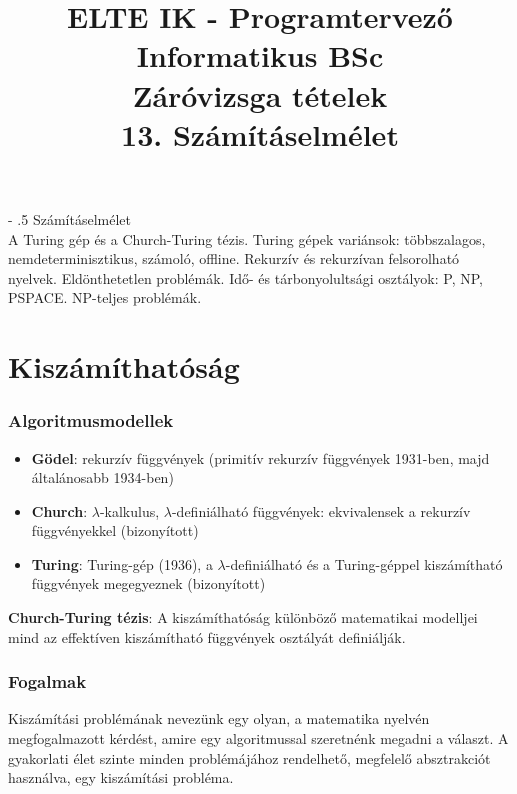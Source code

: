 \documentclass[margin=0px]{article}
\title{\textbf{{\Large ELTE IK - Programtervező Informatikus BSc} \vspace{0.2cm} \\ {\huge Záróvizsga tételek}} \vspace{0.3cm} \\ 13. Számításelmélet}
\author{}
\date{}
\makeatletter
\renewcommand\paragraph{%
	\@startsection{paragraph}{4}{0mm}%
	{-\baselineskip}%
	{.5\baselineskip}%
	{\normalfont\normalsize\bfseries}}
\newenvironment{tetel}[1]{\paragraph{#1 \\}}{}
\makeatother
\begin{document}
\maketitle

\begin{tetel}{Számításelmélet}
    A Turing gép és a Church-Turing tézis. Turing gépek variánsok: többszalagos, nemdeterminisztikus, számoló, offline. Rekurzív és rekurzívan felsorolható nyelvek. Eldönthetetlen problémák. Idő- és tárbonyolultsági osztályok: P, NP, PSPACE. NP-teljes problémák.
\end{tetel}

\section{Kiszámíthatóság}

\subsubsection{Algoritmusmodellek}

\begin{itemize}
    \item	\textbf{Gödel}: rekurzív függvények (primitív rekurzív függvények 1931-ben, majd általánosabb 1934-ben)

    \item	\textbf{Church}: $\lambda$-kalkulus, $\lambda$-definiálható függvények: ekvivalensek a rekurzív függvényekkel (bizonyított)

    \item	\textbf{Turing}: Turing-gép (1936), a $\lambda$-definiálható és a Turing-géppel kiszámítható függvények megegyeznek (bizonyított)

\end{itemize}

\noindent \textbf{Church-Turing tézis}: A kiszámíthatóság különböző matematikai modelljei mind az effektíven
kiszámítható függvények osztályát definiálják.

\subsubsection{Fogalmak}

Kiszámítási problémának nevezünk egy olyan, a matematika nyelvén megfogalmazott
kérdést, amire egy algoritmussal szeretnénk megadni a választ. A
gyakorlati élet szinte minden problémájához rendelhető, megfelelő absztrakciót
használva, egy kiszámítási probléma.\\
\end{document}
